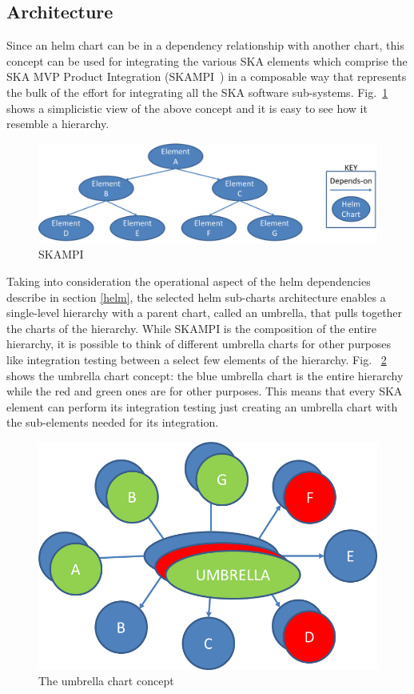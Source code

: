 \documentclass[a4paper]{spie}  %
\begin{document}
\subsection{Architecture}
Since an helm chart can be in a dependency relationship with another chart, this concept can be used for integrating the various SKA elements which comprise the SKA MVP Product Integration (SKAMPI~\cite{SKAMPI}) in a composable way that represents the bulk of the effort for integrating all the SKA software sub-systems. Fig.~\ref{fig:skampi} shows a simplicistic view of the above concept and it is easy to see how it resemble a hierarchy.

\begin{figure}[!htb]
   \centering
   \includegraphics*[width=0.8\columnwidth]{simple_skampi}
   \caption{SKAMPI}
   \label{fig:skampi}
\end{figure}

Taking into consideration the operational aspect of the helm dependencies describe in section \ref{helm}, the selected helm sub-charts architecture enables a single-level hierarchy with a parent chart, called an umbrella, that pulls together the charts of the hierarchy. While SKAMPI is the composition of the entire hierarchy, it is possible to think of different umbrella charts for other purposes like integration testing between a select few elements of the hierarchy. Fig. ~\ref{fig:umbrella_chart} shows the umbrella chart concept: the blue umbrella chart is the entire hierarchy while the red and green ones are for other purposes. This means that every SKA element can perform its integration testing just creating an umbrella chart with the sub-elements needed for its integration.

\begin{figure}[!htb]
   \centering
   \includegraphics*[width=0.5\columnwidth]{umbrella_chart.png}
   \caption{The umbrella chart concept}
   \label{fig:umbrella_chart}
\end{figure}
\end{document}
